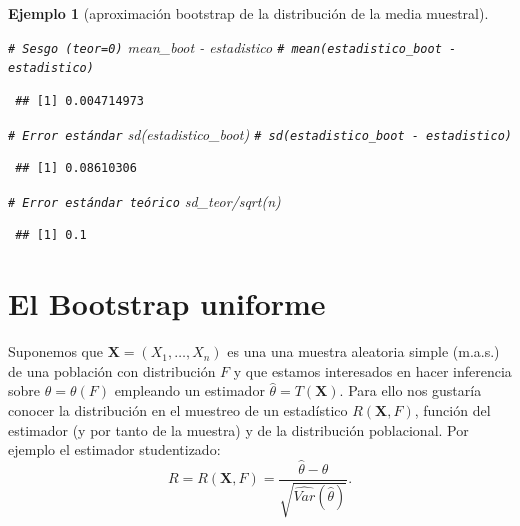 \documentclass[
]{book}
\newenvironment{Shaded}{\begin{snugshade}}{\end{snugshade}}
\newcommand{\CommentTok}[1]{\textcolor[rgb]{0.56,0.35,0.01}{\textit{#1}}}
\newcommand{\FunctionTok}[1]{\textcolor[rgb]{0.00,0.00,0.00}{#1}}
\newcommand{\NormalTok}[1]{#1}
\newcommand{\SpecialCharTok}[1]{\textcolor[rgb]{0.00,0.00,0.00}{#1}}
\theoremstyle{break}
\newtheorem{example}{Ejemplo}[chapter]
\theoremstyle{nonumberplain}
\renewcommand{\CommentTok}[1]{\textcolor[rgb]{0.41,0.41,0.41}{\texttt{#1}}}
\begin{document}
\begin{example}[aproximación bootstrap de la distribución de la media muestral]
\begin{Shaded}
\begin{Highlighting}[]
\CommentTok{\# Sesgo (teor=0)}
\NormalTok{mean\_boot }\SpecialCharTok{{-}}\NormalTok{ estadistico }\CommentTok{\# mean(estadistico\_boot {-} estadistico)}
\end{Highlighting}
\end{Shaded}

\begin{verbatim}
 ## [1] 0.004714973
\end{verbatim}

\begin{Shaded}
\begin{Highlighting}[]
\CommentTok{\# Error estándar}
\FunctionTok{sd}\NormalTok{(estadistico\_boot) }\CommentTok{\# sd(estadistico\_boot {-} estadistico)}
\end{Highlighting}
\end{Shaded}

\begin{verbatim}
 ## [1] 0.08610306
\end{verbatim}

\begin{Shaded}
\begin{Highlighting}[]
\CommentTok{\# Error estándar teórico}
\NormalTok{sd\_teor}\SpecialCharTok{/}\FunctionTok{sqrt}\NormalTok{(n) }
\end{Highlighting}
\end{Shaded}

\begin{verbatim}
 ## [1] 0.1
\end{verbatim}

\end{example}

\hypertarget{boot-unif}{%
\section{El Bootstrap uniforme}\label{boot-unif}}

Suponemos que \(\mathbf{X}=\left( X_1,\ldots ,X_n \right)\) es una una muestra aleatoria simple (m.a.s.)
de una población con distribución \(F\) y que estamos interesados en hacer inferencia sobre \(\theta =\theta \left(F \right)\) empleando un estimador \(\hat{\theta} = T\left( \mathbf{X} \right)\).
Para ello nos gustaría conocer la distribución en el muestreo de un estadístico \(R\left( \mathbf{X},F \right)\), función del estimador (y por tanto de la muestra) y de la distribución poblacional.
Por ejemplo el estimador studentizado:
\[R=R\left( \mathbf{X},F \right) = \frac{\hat \theta - \theta}{\sqrt{\widehat{Var}(\hat \theta)}}.\]
\end{document}
